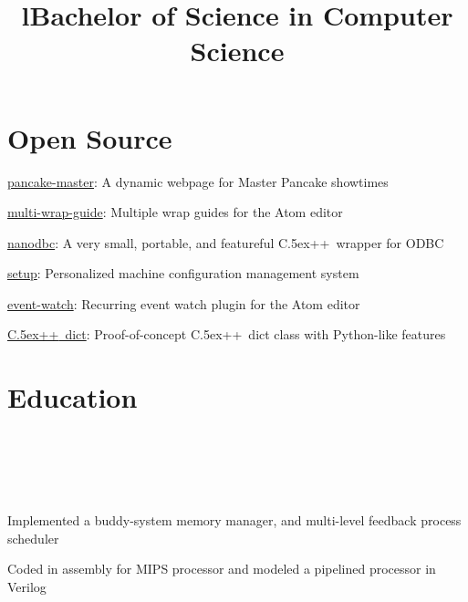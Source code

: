 \documentclass[12pt, tweaklist, line]{res}
\let\tempone\itemize
\let\temptwo\enditemize
\renewenvironment{itemize}{\tempone\vspace{-.15in}\setlength{\topsep}{0pt}\setlength{\itemsep}{3pt}\vspace{-.15in}}{\temptwo}
\def\Cplusplus{{\rm C\raise.5ex\hbox{\small ++}}}
\begin{document}
\begin{resume}
\section{Open Source}
\begin{itemize}
\vspace{.55in} %
\item \href{http://pancake.lexicalunit.com}{pancake-master}: A dynamic webpage for Master Pancake showtimes
\item \href{https://atom.io/packages/multi-wrap-guide}{multi-wrap-guide}: Multiple wrap guides for the Atom editor%
\item \href{http://nanodbc.lexicalunit.com}{nanodbc}: A very small, portable, and featureful \Cplusplus~wrapper for ODBC
\item \href{https://github.com/lexicalunit/setup}{setup}: Personalized machine configuration management system
\item \href{https://atom.io/packages/event-watch}{event-watch}: Recurring event watch plugin for the Atom editor
\item \href{https://github.com/lexicalunit/dict}{\Cplusplus~dict}: Proof-of-concept \Cplusplus~dict class with Python-like features
\end{itemize}

\pagebreak

\section{Education}
\begin{format}
  \\
  \title{l}\\
  \body\\
\end{format}

\title{Bachelor of Science in Computer Science}
\begin{position}
\begin{itemize}
\item Implemented a buddy-system memory manager, and multi-level feedback process scheduler
\item Coded in assembly for MIPS processor and modeled a pipelined processor in Verilog
\end{itemize}
\end{position}


\end{resume}
\end{document}

